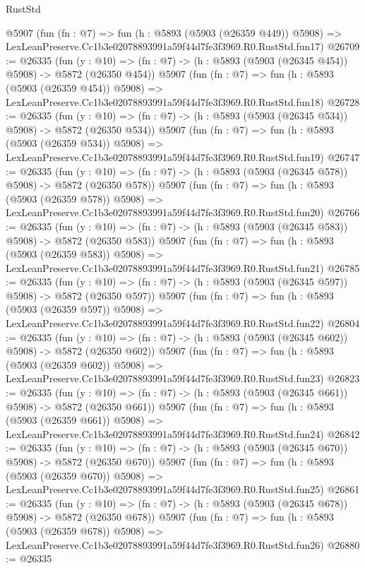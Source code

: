 \begin{lexlean}{RustStd}
\begin{coremodule}
    @5907
    (fun (fn : @7) =>
    fun (h : @5893 (@5903 (@26359 @449)) @5908) =>
    LexLeanPreserve.Cc1b3e02078893991a59f44d7fe3f3969.R0.RustStd.fun17)
@26709 := @26335
    (fun (y : @10) => (fn : @7) -> (h : @5893 (@5903 (@26345 @454)) @5908) -> @5872 (@26350 @454))
    @5907
    (fun (fn : @7) =>
    fun (h : @5893 (@5903 (@26359 @454)) @5908) =>
    LexLeanPreserve.Cc1b3e02078893991a59f44d7fe3f3969.R0.RustStd.fun18)
@26728 := @26335
    (fun (y : @10) => (fn : @7) -> (h : @5893 (@5903 (@26345 @534)) @5908) -> @5872 (@26350 @534))
    @5907
    (fun (fn : @7) =>
    fun (h : @5893 (@5903 (@26359 @534)) @5908) =>
    LexLeanPreserve.Cc1b3e02078893991a59f44d7fe3f3969.R0.RustStd.fun19)
@26747 := @26335
    (fun (y : @10) => (fn : @7) -> (h : @5893 (@5903 (@26345 @578)) @5908) -> @5872 (@26350 @578))
    @5907
    (fun (fn : @7) =>
    fun (h : @5893 (@5903 (@26359 @578)) @5908) =>
    LexLeanPreserve.Cc1b3e02078893991a59f44d7fe3f3969.R0.RustStd.fun20)
@26766 := @26335
    (fun (y : @10) => (fn : @7) -> (h : @5893 (@5903 (@26345 @583)) @5908) -> @5872 (@26350 @583))
    @5907
    (fun (fn : @7) =>
    fun (h : @5893 (@5903 (@26359 @583)) @5908) =>
    LexLeanPreserve.Cc1b3e02078893991a59f44d7fe3f3969.R0.RustStd.fun21)
@26785 := @26335
    (fun (y : @10) => (fn : @7) -> (h : @5893 (@5903 (@26345 @597)) @5908) -> @5872 (@26350 @597))
    @5907
    (fun (fn : @7) =>
    fun (h : @5893 (@5903 (@26359 @597)) @5908) =>
    LexLeanPreserve.Cc1b3e02078893991a59f44d7fe3f3969.R0.RustStd.fun22)
@26804 := @26335
    (fun (y : @10) => (fn : @7) -> (h : @5893 (@5903 (@26345 @602)) @5908) -> @5872 (@26350 @602))
    @5907
    (fun (fn : @7) =>
    fun (h : @5893 (@5903 (@26359 @602)) @5908) =>
    LexLeanPreserve.Cc1b3e02078893991a59f44d7fe3f3969.R0.RustStd.fun23)
@26823 := @26335
    (fun (y : @10) => (fn : @7) -> (h : @5893 (@5903 (@26345 @661)) @5908) -> @5872 (@26350 @661))
    @5907
    (fun (fn : @7) =>
    fun (h : @5893 (@5903 (@26359 @661)) @5908) =>
    LexLeanPreserve.Cc1b3e02078893991a59f44d7fe3f3969.R0.RustStd.fun24)
@26842 := @26335
    (fun (y : @10) => (fn : @7) -> (h : @5893 (@5903 (@26345 @670)) @5908) -> @5872 (@26350 @670))
    @5907
    (fun (fn : @7) =>
    fun (h : @5893 (@5903 (@26359 @670)) @5908) =>
    LexLeanPreserve.Cc1b3e02078893991a59f44d7fe3f3969.R0.RustStd.fun25)
@26861 := @26335
    (fun (y : @10) => (fn : @7) -> (h : @5893 (@5903 (@26345 @678)) @5908) -> @5872 (@26350 @678))
    @5907
    (fun (fn : @7) =>
    fun (h : @5893 (@5903 (@26359 @678)) @5908) =>
    LexLeanPreserve.Cc1b3e02078893991a59f44d7fe3f3969.R0.RustStd.fun26)
@26880 := @26335

\end{coremodule}
\end{lexlean}
